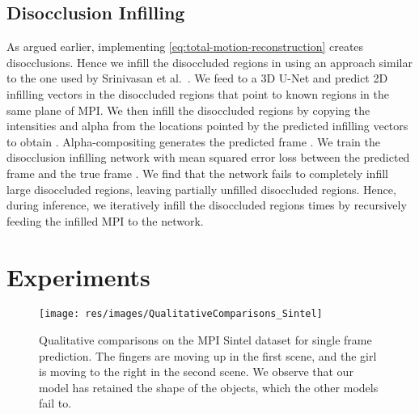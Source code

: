 \documentclass[preprint]{vgtc}
\def\etal{et al.}
\begin{document}
    \subsection{Disocclusion Infilling}\label{subsec:infilling}
    As argued earlier, implementing \autoref{eq:total-motion-reconstruction} creates disocclusions.
    Hence we infill the disoccluded regions in  using an approach similar to the one used by Srinivasan \etal~\cite{srinivasan2019pushing}.
    We feed  to a 3D U-Net and predict 2D infilling vectors in the disoccluded regions that point to known regions in the same plane of MPI\@.
    We then infill the disoccluded regions by copying the intensities and alpha from the locations pointed by the predicted infilling vectors to obtain .
    Alpha-compositing  generates the predicted frame .
    We train the disocclusion infilling network with mean squared error loss between the predicted frame  and the true frame .
    We find that the network fails to completely infill large disoccluded regions, leaving partially unfilled disoccluded regions.
    Hence, during inference, we iteratively infill the disoccluded regions  times by recursively feeding the infilled MPI to the network.


    \section{Experiments}\label{sec:experiments}

    \begin{figure*}
        \centering
        \texttt{[image: res/images/QualitativeComparisons\_Sintel]}
        \caption{Qualitative comparisons on the MPI Sintel dataset for single frame prediction.
        The fingers are moving up in the first scene, and the girl is moving to the right in the second scene.
        We observe that our model has retained the shape of the objects, which the other models fail to.
}
        \label{fig:qualitative-comparisons-sintel}
    \end{figure*}
\end{document}
